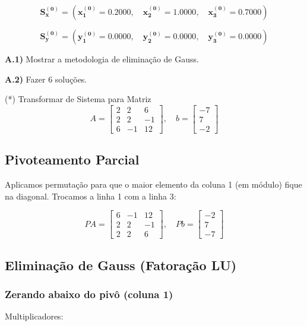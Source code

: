 \documentclass[12pt,a4paper]{article}
\begin{document}
\[
\boldsymbol{S_x^{(0)}} =
\left(
\boldsymbol{x_1^{(0)}} = 0.2000, \quad
\boldsymbol{x_2^{(0)}} = 1.0000, \quad
\boldsymbol{x_3^{(0)}} = 0.7000
\right)
\]

\[
\boldsymbol{S_y^{(0)}} =
\left(
\boldsymbol{y_1^{(0)}} = 0.0000, \quad
\boldsymbol{y_2^{(0)}} = 0.0000, \quad
\boldsymbol{y_3^{(0)}} = 0.0000
\right)
\]

\textbf{A.1)} Mostrar a metodologia de eliminação de Gauss.

\textbf{A.2)} Fazer 6 soluções.

\vspace{0.5cm}

(*) Transformar de Sistema para Matriz
\[
A =
\begin{bmatrix}
2 & 2 & 6 \\
2 & 2 & -1 \\
6 & -1 & 12
\end{bmatrix},
\quad
b =
\begin{bmatrix}
-7 \\
7 \\
-2
\end{bmatrix}
\]

\subsection{Pivoteamento Parcial}

Aplicamos permutação para que o maior elemento da coluna 1 (em módulo) fique na diagonal. Trocamos a linha 1 com a linha 3:

\[
PA =
\begin{bmatrix}
6 & -1 & 12 \\
2 & 2 & -1 \\
2 & 2 & 6
\end{bmatrix},
\quad
Pb =
\begin{bmatrix}
-2 \\
7 \\
-7
\end{bmatrix}
\]

\subsection{Eliminação de Gauss (Fatoração LU)}

\subsubsection{Zerando abaixo do pivô (coluna 1)}

Multiplicadores:
\end{document}
